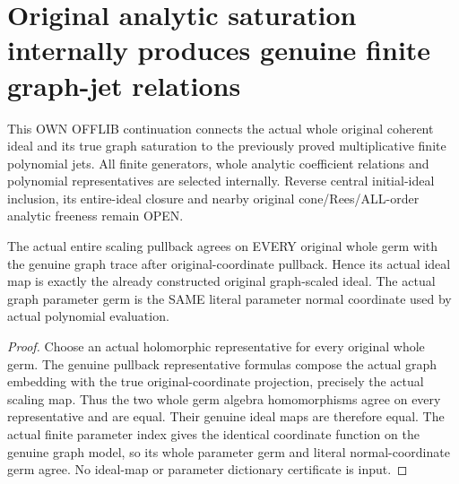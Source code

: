 \section{Original analytic saturation internally produces genuine finite graph-jet relations}
This OWN OFFLIB continuation connects the actual whole original coherent ideal and its true graph saturation to the previously proved multiplicative finite polynomial jets. All finite generators, whole analytic coefficient relations and polynomial representatives are selected internally. Reverse central initial-ideal inclusion, its entire-ideal closure and nearby original cone/Rees/ALL-order analytic freeness remain OPEN.

\begin{lemma}
\label{hir:relative-normal-graph-relations-actual-scaling-ideal}
\leanok
The actual entire scaling pullback agrees on EVERY original whole germ with the genuine graph trace after original-coordinate pullback. Hence its actual ideal map is exactly the already constructed original graph-scaled ideal. The actual graph parameter germ is the SAME literal parameter normal coordinate used by actual polynomial evaluation.
\end{lemma}
\begin{proof}
Choose an actual holomorphic representative for every original whole germ. The genuine pullback representative formulas compose the actual graph embedding with the true original-coordinate projection, precisely the actual scaling map. Thus the two whole germ algebra homomorphisms agree on every representative and are equal. Their genuine ideal maps are therefore equal. The actual finite parameter index gives the identical coordinate function on the genuine graph model, so its whole parameter germ and literal normal-coordinate germ agree. No ideal-map or parameter dictionary certificate is input.
\end{proof}


